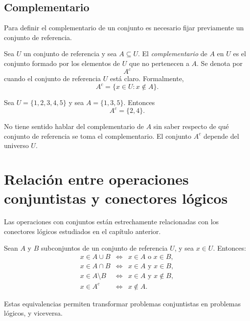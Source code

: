 \subsection{Complementario}

Para definir el complementario de un conjunto es necesario fijar previamente un conjunto de referencia.

\begin{definicion}[Complementario]
Sea \(U\) un conjunto de referencia y sea \(A\subseteq U\). El \emph{complementario} de \(A\) en \(U\) es el conjunto formado por los elementos de \(U\) que no pertenecen a \(A\). Se denota por
\[
  A^c
\]
cuando el conjunto de referencia \(U\) está claro. Formalmente,
\[
  A^c = \{x\in U : x\notin A\}.
\]
\end{definicion}

\begin{ejemplo}
Sea \(U=\{1,2,3,4,5\}\) y sea \(A=\{1,3,5\}\). Entonces
\[
  A^c=\{2,4\}.
\]
\end{ejemplo}

\begin{advertencia}
No tiene sentido hablar del complementario de \(A\) sin saber respecto de qué conjunto de referencia se toma el complementario. El conjunto \(A^c\) depende del universo \(U\).
\end{advertencia}

\section{Relación entre operaciones conjuntistas y conectores lógicos}

Las operaciones con conjuntos están estrechamente relacionadas con los conectores lógicos estudiados en el capítulo anterior.

Sean \(A\) y \(B\) subconjuntos de un conjunto de referencia \(U\), y sea \(x\in U\). Entonces:
\[
\begin{array}{rcl}
  x\in A\cup B &\Longleftrightarrow& x\in A \text{ o } x\in B,\\[2mm]
  x\in A\cap B &\Longleftrightarrow& x\in A \text{ y } x\in B,\\[2mm]
  x\in A\setminus B &\Longleftrightarrow& x\in A \text{ y } x\notin B,\\[2mm]
  x\in A^c &\Longleftrightarrow& x\notin A.
\end{array}
\]

Estas equivalencias permiten transformar problemas conjuntistas en problemas lógicos, y viceversa.

